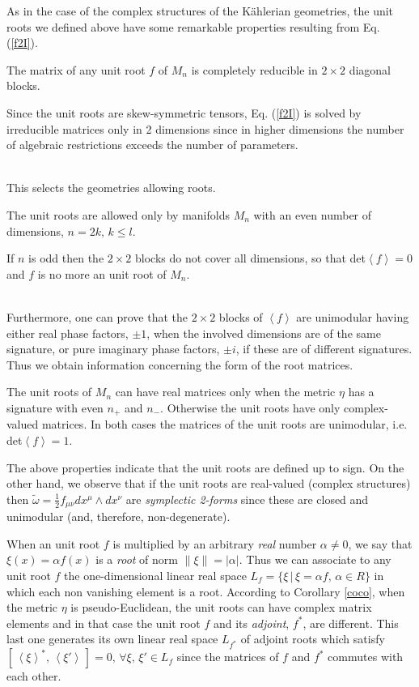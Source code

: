 \documentclass[a4paper,12pt]{article}
\begin{document}
As in the case of the complex structures of the K\" ahlerian geometries, the 
unit roots we defined above have some remarkable properties resulting from 
Eq. (\ref{f2I}).
\begin{lem}
The matrix of any unit root $f$ of $M_n$ is completely 
reducible in $2\times 2$ diagonal blocks.  
\end{lem}
\begin{demo}
Since the unit roots are  skew-symmetric tensors,  Eq. (\ref{f2I}) 
is solved by irreducible matrices only in 2 dimensions since in higher 
dimensions the number of algebraic restrictions exceeds the number of 
parameters.
\end{demo}\\
This selects the geometries allowing roots.
\begin{cor}
The unit roots are allowed only by manifolds $M_n$ with an even number of 
dimensions, $n=2k,\, k\le l$. 
\end{cor}
\begin{demo}
If $n$ is odd then the $2\times 2$ blocks do not cover all dimensions, so 
that det$\left<f\right>=0$ and $f$ is no more an unit root of $M_n$.
\end{demo}\\
Furthermore, one can prove that the $2\times 2$ blocks of 
$\left<f\right>$ are unimodular having either real phase factors, $\pm 1$, 
when the involved dimensions are of the same signature, or pure imaginary 
phase factors, $\pm i$, if these are of different signatures. 
Thus we obtain information concerning the form of the root matrices.  
\begin{cor}\label{coco}
The unit roots of $M_n$ can have real matrices only when the metric $\eta$ 
has a signature with even $n_{+}$ and $n_{-}$.  
Otherwise the unit roots have only complex-valued matrices. 
In both cases the matrices of the unit roots are unimodular, 
i.e. {\rm det}$\left<f\right>=1$. 
\end{cor} 
The above properties indicate that the unit roots are defined up to 
sign. On the other hand, we observe that if the unit roots are real-valued 
(complex structures) then 
$\tilde\omega =\frac{1}{2}f_{\mu\nu}dx^{\mu}\land dx^{\nu}$ are 
{\em symplectic 2-forms} since these are closed and unimodular (and, therefore, 
non-degenerate).

When an unit root $f$ is multiplied by an arbitrary {\em real} number 
$\alpha \not=0$, we say that $\xi(x)=\alpha f(x)$ is a {\em root} of norm 
$\|\xi\|=|\alpha|$. Thus we can associate to any unit root $f$ 
the one-dimensional linear real space $L_f =\{\xi\,|\,\xi=\alpha f,\, 
\alpha\in R\}$ in which each non vanishing element is a root. According to
Corollary \ref{coco}, when the metric $\eta$ is pseudo-Euclidean,
the unit roots can have complex matrix elements and in that case the unit
root $f$ and its {\em adjoint}, $f^*$, are different. This last one generates
its own linear real space $L_{f^*}$  of adjoint roots  which satisfy 
$\left[ \,\left<\xi \right>^* ,\,\left<\xi'\right>\,\right] =0,\, \forall 
\xi,\, \xi' \in L_f$ since the matrices of $f$ and $f^*$ commutes with each 
other.
\end{document}
